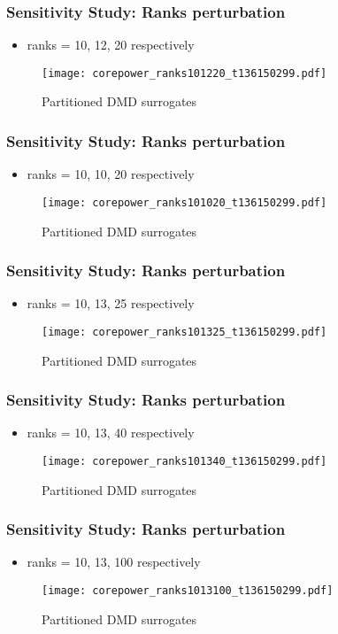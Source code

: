 \documentclass[fleqn]{beamer}
\begin{document}
\begin{frame}
\frametitle{Sensitivity Study: Ranks perturbation}
\begin{itemize}
 \item ranks = 10, 12, 20 respectively
\end{itemize}
\begin{figure}[ht]
\texttt{[image: corepower\_ranks101220\_t136150299.pdf]}
\caption{Partitioned DMD surrogates}
\end{figure}
\end{frame}

\begin{frame}
\frametitle{Sensitivity Study: Ranks perturbation}
\begin{itemize}
 \item ranks = 10, 10, 20 respectively
\end{itemize}
\begin{figure}[ht]
\texttt{[image: corepower\_ranks101020\_t136150299.pdf]}
\caption{Partitioned DMD surrogates}
\end{figure}
\end{frame}

\begin{frame}
\frametitle{Sensitivity Study: Ranks perturbation}
\begin{itemize}
 \item ranks = 10, 13, 25 respectively
\end{itemize}
\begin{figure}[ht]
\texttt{[image: corepower\_ranks101325\_t136150299.pdf]}
\caption{Partitioned DMD surrogates}
\end{figure}
\end{frame}

\begin{frame}
\frametitle{Sensitivity Study: Ranks perturbation}
\begin{itemize}
 \item ranks = 10, 13, 40 respectively
\end{itemize}
\begin{figure}[ht]
\texttt{[image: corepower\_ranks101340\_t136150299.pdf]}
\caption{Partitioned DMD surrogates}
\end{figure}
\end{frame}

\begin{frame}
\frametitle{Sensitivity Study: Ranks perturbation}
\begin{itemize}
 \item ranks = 10, 13, 100 respectively
\end{itemize}
\begin{figure}[ht]
\texttt{[image: corepower\_ranks1013100\_t136150299.pdf]}
\caption{Partitioned DMD surrogates}
\end{figure}
\end{frame}
\end{document}
